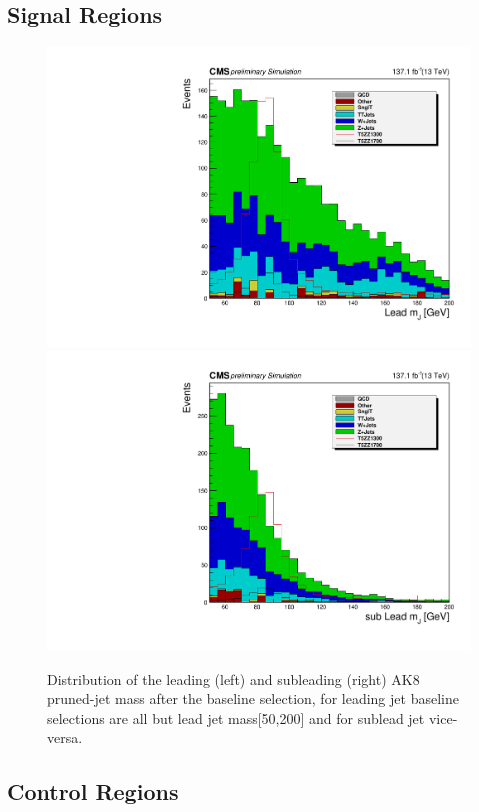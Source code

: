 \subsection{Signal Regions}

\begin{figure}[htbp!]
  \begin{center}
    \includegraphics[trim={5px 5px 5px 5px},clip,width=0.48\linewidth]{plots/event-selection/PrunedMass1scaled137_fitting.pdf}
    \includegraphics[trim={5px 5px 5px 5px},clip,width=0.48\linewidth]{plots/event-selection/PrunedMass2scaled137_fitting.pdf}
    \caption{
      Distribution of the leading (left) and subleading (right) AK8 pruned-jet mass after the baseline selection, for leading jet baseline selections are all but lead jet mass[50,200] and for sublead jet vice-versa.
    }
    \label{fig:JetMass_baseline}
  \end{center}
\end{figure}


\subsection{Control Regions}

